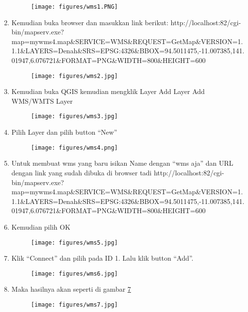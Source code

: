 \begin{enumerate}
\begin{figure}[!htbp]
\centering
\texttt{[image: figures/wms1.PNG]}
\label{wms 1}
\end{figure}
    \item Kemudian buka browser dan masukkan link berikut:
http://localhost:82/cgi-bin/mapserv.exe?map=mywms4.map\&SERVICE=WMS\&REQUEST=GetMap\&VERSION=1.1.1\&LAYERS=Denah\&SRS=EPSG:4326\&BBOX=94.5011475,-11.007385,141.01947,6.076721\&FORMAT=PNG\&WIDTH=800\&HEIGHT=600
\begin{figure}[!htbp]
\centering
\texttt{[image: figures/wms2.jpg]}
\label{wms 2}
\end{figure}
    \item Kemudian buka QGIS kemudian mengklik Layer Add Layer Add WMS/WMTS Layer
\begin{figure}[!htbp]
\centering
\texttt{[image: figures/wms3.jpg]}
\label{wms 3}
\end{figure}
    \item Pilih Layer dan pilih button “New”
\begin{figure}[!htbp]
\centering
\texttt{[image: figures/wms4.png]}
\label{wms 4}
\end{figure}
    \item Untuk membuat wms yang baru isikan Name dengan “wms aja” dan URL dengan link yang sudah dibuka di browser tadi http://localhost:82/cgi-bin/mapserv.exe?map=mywms4.map\&SERVICE=WMS\&REQUEST=GetMap\&VERSION=1.1.1\&LAYERS=Denah\&SRS=EPSG:4326\&BBOX=94.5011475,-11.007385,141.01947,6.076721\&FORMAT=PNG\&WIDTH=800\&HEIGHT=600
    \item Kemudian pilih OK
\begin{figure}[!htbp]
\centering
\texttt{[image: figures/wms5.jpg]}
\label{wms 5}
\end{figure}
    \item Klik “Connect” dan pilih pada ID 1. Lalu klik button “Add”.
\begin{figure}[!htbp]
\centering
\texttt{[image: figures/wms6.jpg]}
\label{wms 6}
\end{figure}
    \item Maka hasilnya akan seperti di gambar \ref{wms 7}
\begin{figure}[!htbp]
\centering
\texttt{[image: figures/wms7.jpg]}
\label{wms 7}
\end{figure}


\end{enumerate}


